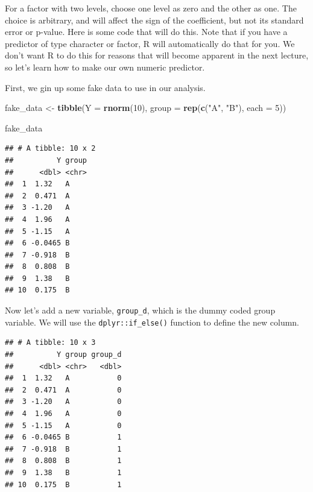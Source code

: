 \documentclass[]{book}
\newenvironment{Shaded}{\begin{snugshade}}{\end{snugshade}}
\newcommand{\DataTypeTok}[1]{\textcolor[rgb]{0.13,0.29,0.53}{#1}}
\newcommand{\DecValTok}[1]{\textcolor[rgb]{0.00,0.00,0.81}{#1}}
\newcommand{\KeywordTok}[1]{\textcolor[rgb]{0.13,0.29,0.53}{\textbf{#1}}}
\newcommand{\NormalTok}[1]{#1}
\newcommand{\OperatorTok}[1]{\textcolor[rgb]{0.81,0.36,0.00}{\textbf{#1}}}
\newcommand{\StringTok}[1]{\textcolor[rgb]{0.31,0.60,0.02}{#1}}
\begin{document}
For a factor with two levels, choose one level as zero and the other as one. The choice is arbitrary, and will affect the sign of the coefficient, but not its standard error or p-value. Here is some code that will do this. Note that if you have a predictor of type character or factor, R will automatically do that for you. We don't want R to do this for reasons that will become apparent in the next lecture, so let's learn how to make our own numeric predictor.

First, we gin up some fake data to use in our analysis.

\begin{Shaded}
\begin{Highlighting}[]
\NormalTok{fake_data <-}\StringTok{ }\KeywordTok{tibble}\NormalTok{(}\DataTypeTok{Y =} \KeywordTok{rnorm}\NormalTok{(}\DecValTok{10}\NormalTok{),}
                    \DataTypeTok{group =} \KeywordTok{rep}\NormalTok{(}\KeywordTok{c}\NormalTok{(}\StringTok{"A"}\NormalTok{, }\StringTok{"B"}\NormalTok{), }\DataTypeTok{each =} \DecValTok{5}\NormalTok{))}

\NormalTok{fake_data}
\end{Highlighting}
\end{Shaded}

\begin{verbatim}
## # A tibble: 10 x 2
##          Y group
##      <dbl> <chr>
##  1  1.32   A    
##  2  0.471  A    
##  3 -1.20   A    
##  4  1.96   A    
##  5 -1.15   A    
##  6 -0.0465 B    
##  7 -0.918  B    
##  8  0.808  B    
##  9  1.38   B    
## 10  0.175  B
\end{verbatim}

Now let's add a new variable, \texttt{group\_d}, which is the dummy coded group variable. We will use the \texttt{dplyr::if\_else()} function to define the new column.

\begin{Shaded}
\end{Shaded}

\begin{verbatim}
## # A tibble: 10 x 3
##          Y group group_d
##      <dbl> <chr>   <dbl>
##  1  1.32   A           0
##  2  0.471  A           0
##  3 -1.20   A           0
##  4  1.96   A           0
##  5 -1.15   A           0
##  6 -0.0465 B           1
##  7 -0.918  B           1
##  8  0.808  B           1
##  9  1.38   B           1
## 10  0.175  B           1
\end{verbatim}
\end{document}
